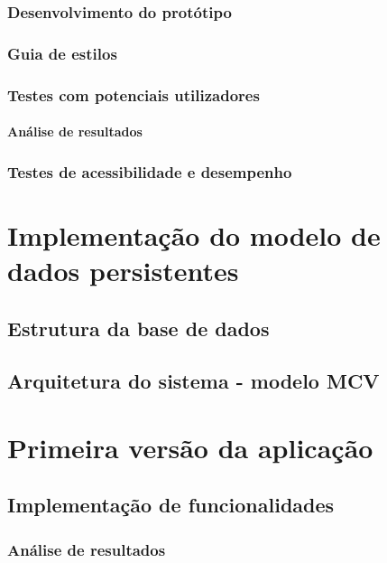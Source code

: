 \documentclass[12pt, twoside]{report}
\begin{document}
	\subsection{Desenvolvimento do protótipo}

	\subsection{Guia de estilos}
	
	
	\subsection{Testes com potenciais utilizadores}
	
	\subsubsection{Análise de resultados}
	
	\subsection{Testes de acessibilidade e desempenho}
	
	\chapter{Implementação do modelo de dados persistentes}
	\section{Estrutura da base de dados}
	
	\section{Arquitetura do sistema - modelo MCV}
	
	
	

	\chapter{Primeira versão da aplicação}
	\section{Implementação de funcionalidades}

		
	
	\subsection{Análise de resultados}
	
\end{document}

